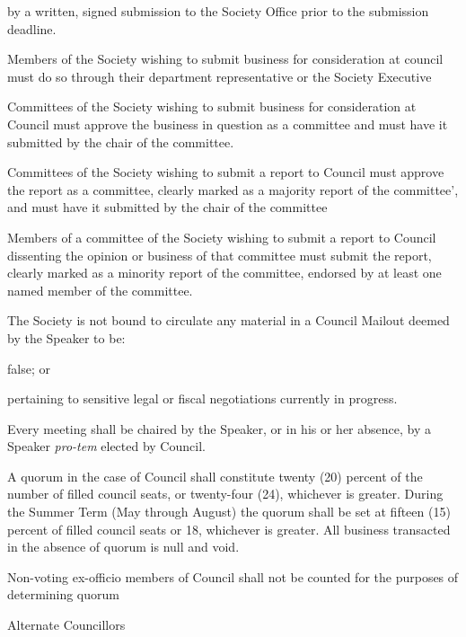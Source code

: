 \begin{longenum}[ label*=\thesubsection.\arabic*., align=left]
\begin{longenum}[ label*=\arabic*., align=left]
        \item by a written, signed submission to the Society Office prior to the submission deadline.
	\end{longenum} 
    \item Members of the Society wishing to submit business for consideration at council must do so through
their department representative or the Society Executive
	\item Committees of the Society wishing to submit business for consideration at Council must approve the
business in question as a committee and must have it submitted by the chair of the committee.
	\begin{longenum}[ label*=\arabic*., align=left]
		\item Committees of the Society wishing to submit a report to Council must approve the report as a committee, clearly marked as a majority report of the committee', and must have it submitted by the chair of the committee
        \item Members of a committee of the Society wishing to submit a report to Council dissenting the opinion or business of that committee must submit the report, clearly marked as a minority report of the committee, endorsed by at least one named member of the committee. 
	\end{longenum}
    \item The Society is not bound to circulate any material in a Council Mailout deemed by the Speaker to be:
    \begin{longenum}[ label*=\arabic*., align=left]
		\item false; or
        \item pertaining to sensitive legal or fiscal negotiations currently in progress.
	\end{longenum}
    \item Every meeting shall be chaired by the Speaker, or in his or her absence, by a Speaker \textit{pro-tem} elected by Council.
    \item A quorum in the case of Council shall constitute twenty (20) percent of the number of filled council seats, or twenty-four (24), whichever is greater. During the Summer Term (May through August) the quorum shall be set at fifteen (15) percent of filled council seats or 18, whichever is greater. All business transacted in the absence of quorum is null and void.
    \item Non-voting ex-officio members of Council shall not be counted for the purposes of determining quorum
    \item Alternate Councillors

\end{longenum}
